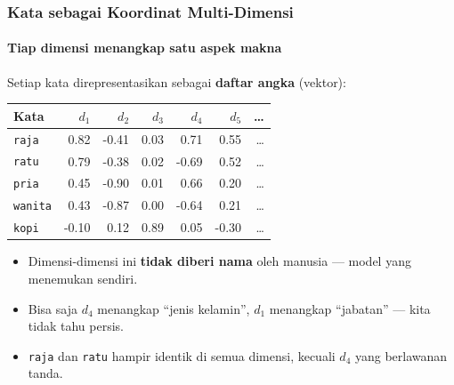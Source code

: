 \documentclass[t,aspectratio=169,xcolor=dvipsnames]{beamer}
\begin{document}
\begin{frame}[shrink=6]
    \frametitle{Kata sebagai Koordinat Multi-Dimensi}
    \framesubtitle{Tiap dimensi menangkap satu aspek makna}
    \small
    Setiap kata direpresentasikan sebagai \textbf{daftar angka} (vektor):
    \vspace{0.1em}
    \begin{center}
    \footnotesize
    \begin{tabular}{lrrrrrr}
        \toprule
        Kata & $d_1$ & $d_2$ & $d_3$ & $d_4$ & $d_5$ & \ldots \\
        \midrule
        \texttt{raja}   &  0.82 & -0.41 &  0.03 &  0.71 &  0.55 & \ldots \\
        \texttt{ratu}   &  0.79 & -0.38 &  0.02 & -0.69 &  0.52 & \ldots \\
        \texttt{pria}   &  0.45 & -0.90 &  0.01 &  0.66 &  0.20 & \ldots \\
        \texttt{wanita} &  0.43 & -0.87 &  0.00 & -0.64 &  0.21 & \ldots \\
        \texttt{kopi}   & -0.10 &  0.12 &  0.89 &  0.05 & -0.30 & \ldots \\
        \bottomrule
    \end{tabular}
    \end{center}
    \vspace{0.1em}
    \begin{itemize}
        \item Dimensi-dimensi ini \textbf{tidak diberi nama} oleh manusia --- model yang menemukan sendiri.
        \item Bisa saja $d_4$ menangkap ``jenis kelamin'', $d_1$ menangkap ``jabatan'' --- kita tidak tahu persis.
        \item \texttt{raja} dan \texttt{ratu} hampir identik di semua dimensi, kecuali $d_4$ yang berlawanan tanda.
    \end{itemize}
\end{frame}
\end{document}
